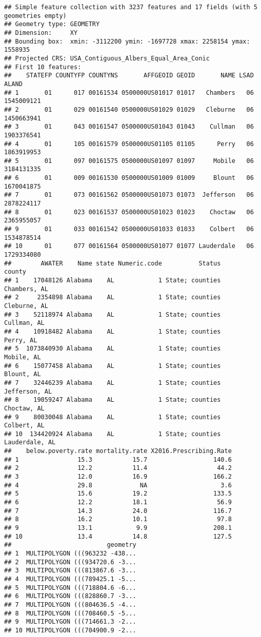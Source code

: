 \documentclass[
]{article}
\begin{document}
\begin{verbatim}
## Simple feature collection with 3237 features and 17 fields (with 5 geometries empty)
## Geometry type: GEOMETRY
## Dimension:     XY
## Bounding box:  xmin: -3112200 ymin: -1697728 xmax: 2258154 ymax: 1558935
## Projected CRS: USA_Contiguous_Albers_Equal_Area_Conic
## First 10 features:
##    STATEFP COUNTYFP COUNTYNS       AFFGEOID GEOID       NAME LSAD      ALAND
## 1       01      017 00161534 0500000US01017 01017   Chambers   06 1545009121
## 2       01      029 00161540 0500000US01029 01029   Cleburne   06 1450663941
## 3       01      043 00161547 0500000US01043 01043    Cullman   06 1903376541
## 4       01      105 00161579 0500000US01105 01105      Perry   06 1863919953
## 5       01      097 00161575 0500000US01097 01097     Mobile   06 3184131335
## 6       01      009 00161530 0500000US01009 01009     Blount   06 1670041875
## 7       01      073 00161562 0500000US01073 01073  Jefferson   06 2878224117
## 8       01      023 00161537 0500000US01023 01023    Choctaw   06 2365955057
## 9       01      033 00161542 0500000US01033 01033    Colbert   06 1534878514
## 10      01      077 00161564 0500000US01077 01077 Lauderdale   06 1729334080
##        AWATER    Name state Numeric.code          Status         county
## 1    17048126 Alabama    AL            1 State; counties   Chambers, AL
## 2     2354898 Alabama    AL            1 State; counties   Cleburne, AL
## 3    52118974 Alabama    AL            1 State; counties    Cullman, AL
## 4    10918482 Alabama    AL            1 State; counties      Perry, AL
## 5  1073840930 Alabama    AL            1 State; counties     Mobile, AL
## 6    15077458 Alabama    AL            1 State; counties     Blount, AL
## 7    32446239 Alabama    AL            1 State; counties  Jefferson, AL
## 8    19059247 Alabama    AL            1 State; counties    Choctaw, AL
## 9    80030048 Alabama    AL            1 State; counties    Colbert, AL
## 10  134420924 Alabama    AL            1 State; counties Lauderdale, AL
##    below.poverty.rate mortality.rate X2016.Prescribing.Rate
## 1                15.3           15.7                  140.6
## 2                12.2           11.4                   44.2
## 3                12.0           16.9                  166.2
## 4                29.8             NA                    3.6
## 5                15.6           19.2                  133.5
## 6                12.2           18.1                   56.9
## 7                14.3           24.0                  116.7
## 8                16.2           10.1                   97.8
## 9                13.1            9.9                  208.1
## 10               13.4           14.8                  127.5
##                          geometry
## 1  MULTIPOLYGON (((963232 -438...
## 2  MULTIPOLYGON (((934720.6 -3...
## 3  MULTIPOLYGON (((813867.6 -3...
## 4  MULTIPOLYGON (((789425.1 -5...
## 5  MULTIPOLYGON (((718804.6 -6...
## 6  MULTIPOLYGON (((828860.7 -3...
## 7  MULTIPOLYGON (((804636.5 -4...
## 8  MULTIPOLYGON (((708460.5 -5...
## 9  MULTIPOLYGON (((714661.3 -2...
## 10 MULTIPOLYGON (((704900.9 -2...
\end{verbatim}
\end{document}
